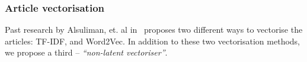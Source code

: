 \documentclass{article}
\begin{document}

\subsubsection{Article vectorisation} \label{section:article-vectorisation}
Past research by Alsuliman, et. al in~\cite{alsuliman2022social} proposes two different ways to vectorise the articles: TF-IDF, and Word2Vec. In addition to these two vectorisation methods, we propose a third -- \emph{``non-latent vectoriser''}.
\end{document}
